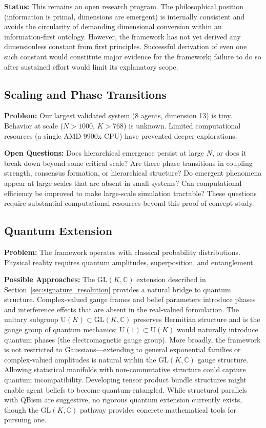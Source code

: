 \documentclass[11pt]{article}
\begin{document}
\textbf{Status:} This remains an open research program. The philosophical position (information is primal, dimensions are emergent) is internally consistent and avoids the circularity of demanding dimensional conversion within an information-first ontology. However, the framework has not yet derived any dimensionless constant from first principles. Successful derivation of even one such constant would constitute major evidence for the framework; failure to do so after sustained effort would limit its explanatory scope.

\subsection{Scaling and Phase Transitions}

\textbf{Problem:} Our largest validated system (8 agents, dimension 13) is tiny. Behavior at scale ($N>1000$, $K>768$) is unknown. Limited computational resources (a single AMD 9900x CPU) have prevented deeper explorations.

\textbf{Open Questions:} Does hierarchical emergence persist at large $N$, or does it break down beyond some critical scale? Are there phase transitions in coupling strength, consensus formation, or hierarchical structure? Do emergent phenomena appear at large scales that are absent in small systems? Can computational efficiency be improved to make large-scale simulation tractable? These questions require substantial computational resources beyond this proof-of-concept study.

\subsection{Quantum Extension}

\textbf{Problem:} The framework operates with classical probability distributions. Physical reality requires quantum amplitudes, superposition, and entanglement.

\textbf{Possible Approaches:} The $\mathrm{GL}(K, \mathbb{C})$ extension described in Section~\ref{sec:signature_resolution} provides a natural bridge to quantum structure. Complex-valued gauge frames and belief parameters introduce phases and interference effects that are absent in the real-valued formulation. The unitary subgroup $\mathrm{U}(K) \subset \mathrm{GL}(K, \mathbb{C})$ preserves Hermitian structure and is the gauge group of quantum mechanics; $\mathrm{U}(1) \subset \mathrm{U}(K)$ would naturally introduce quantum phases (the electromagnetic gauge group). More broadly, the framework is not restricted to Gaussians---extending to general exponential families or complex-valued amplitudes is natural within the $\mathrm{GL}(K, \mathbb{C})$ gauge structure. Allowing statistical manifolds with non-commutative structure could capture quantum incompatibility. Developing tensor product bundle structures might enable agent beliefs to become quantum-entangled. While structural parallels with QBism are suggestive, no rigorous quantum extension currently exists, though the $\mathrm{GL}(K, \mathbb{C})$ pathway provides concrete mathematical tools for pursuing one.
\end{document}
